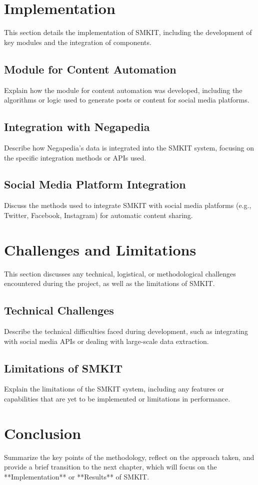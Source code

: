 \section{Implementation}
\label{sec:implementation}
This section details the implementation of SMKIT, including the development of key modules and the integration of components.

\subsection{Module for Content Automation}
\label{subsec:module_for_content_automation}
Explain how the module for content automation was developed, including the algorithms or logic used to generate posts or content for social media platforms.

\subsection{Integration with Negapedia}
\label{subsec:integration_with_negapedia}
Describe how Negapedia’s data is integrated into the SMKIT system, focusing on the specific integration methods or APIs used.

\subsection{Social Media Platform Integration}
\label{subsec:social_media_integration}
Discuss the methods used to integrate SMKIT with social media platforms (e.g., Twitter, Facebook, Instagram) for automatic content sharing.

\section{Challenges and Limitations}
\label{sec:challenges_limitations}
This section discusses any technical, logistical, or methodological challenges encountered during the project, as well as the limitations of SMKIT.

\subsection{Technical Challenges}
\label{subsec:technical_challenges}
Describe the technical difficulties faced during development, such as integrating with social media APIs or dealing with large-scale data extraction.

\subsection{Limitations of SMKIT}
\label{subsec:limitations_of_smkit}
Explain the limitations of the SMKIT system, including any features or capabilities that are yet to be implemented or limitations in performance.

\section{Conclusion}
\label{sec:methodology_conclusion}
Summarize the key points of the methodology, reflect on the approach taken, and provide a brief transition to the next chapter, which will focus on the **Implementation** or **Results** of SMKIT.
